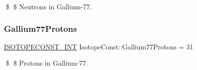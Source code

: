 \$ \$ Neutrons in Gallium-\/77. \mbox{\label{group___isotope_const-_gallium-_ga77_ga7ee619949ea9fde2607d29db9204594d}} 
\subsubsection{\texorpdfstring{Gallium77\+Protons}{Gallium77Protons}}
{\footnotesize\ttfamily \mbox{\hyperlink{group___isotope_const-_macros_ga5f18360b3e99483a35c32d789e62621c}{I\+S\+O\+T\+O\+P\+E\+C\+O\+N\+S\+T\+\_\+\+I\+NT}} Isotope\+Const\+::\+Gallium77\+Protons = 31}

\$ \$ Protons in Gallium-\/77. 